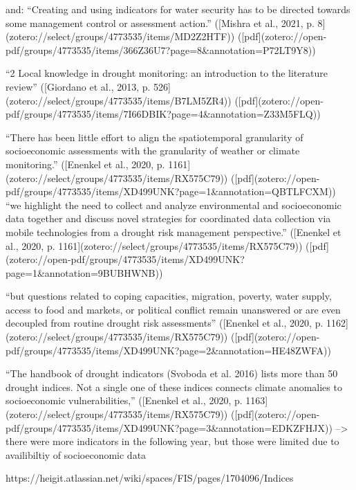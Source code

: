 and: “Creating and using indicators for water security has to be directed towards some management control or assessment action.” ([Mishra et al., 2021, p. 8](zotero://select/groups/4773535/items/MD2Z2HTF)) ([pdf](zotero://open-pdf/groups/4773535/items/366Z36U7?page=8&annotation=P72LT9Y8))


“2 Local knowledge in drought monitoring: an introduction to the literature review” ([Giordano et al., 2013, p. 526](zotero://select/groups/4773535/items/B7LM5ZR4)) ([pdf](zotero://open-pdf/groups/4773535/items/7I66DBIK?page=4&annotation=Z33M5FLQ))

“There has been little effort to align the spatiotemporal granularity of socioeconomic assessments with the granularity of weather or climate monitoring.” ([Enenkel et al., 2020, p. 1161](zotero://select/groups/4773535/items/RX575C79)) ([pdf](zotero://open-pdf/groups/4773535/items/XD499UNK?page=1&annotation=QBTLFCXM))
“we highlight the need to collect and analyze environmental and socioeconomic data together and discuss novel strategies for coordinated data collection via mobile technologies from a drought risk management perspective.” ([Enenkel et al., 2020, p. 1161](zotero://select/groups/4773535/items/RX575C79)) ([pdf](zotero://open-pdf/groups/4773535/items/XD499UNK?page=1&annotation=9BUBHWNB))

“but questions related to coping capacities, migration, poverty, water supply, access to food and markets, or political conflict remain unanswered or are even decoupled from routine drought risk assessments” ([Enenkel et al., 2020, p. 1162](zotero://select/groups/4773535/items/RX575C79)) ([pdf](zotero://open-pdf/groups/4773535/items/XD499UNK?page=2&annotation=HE48ZWFA))

“The handbook of drought indicators (Svoboda et al. 2016) lists more than 50 drought indices. Not a single one of these indices connects climate anomalies to socioeconomic vulnerabilities,” ([Enenkel et al., 2020, p. 1163](zotero://select/groups/4773535/items/RX575C79)) ([pdf](zotero://open-pdf/groups/4773535/items/XD499UNK?page=3&annotation=EDKZFHJX))
--> there were more indicators in the following year, but those were limited due to availibiltiy of socioeconomic data


https://heigit.atlassian.net/wiki/spaces/FIS/pages/1704096/Indices



